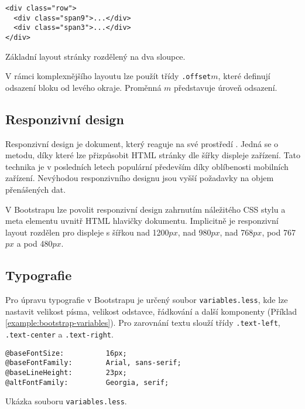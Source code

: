 \begin{example}
    \centering
    \begin{lstlisting}
<div class="row">
  <div class="span9">...</div>
  <div class="span3">...</div>
</div>
    \end{lstlisting}
    \caption{Základní layout stránky rozdělený na dva sloupce.}
    \label{example:basic-layout}
\end{example}

V rámci komplexnějšího layoutu lze použít třídy \texttt{.offset}$m$, které definují odsazení bloku od levého okraje. Proměnná $m$ představuje úroveň odsazení.

\subsection{Responzivní design}

Responzivní design je dokument, který reaguje na své prostředí \cite{responsive-design}. Jedná se o metodu, díky které lze přizpůsobit HTML stránky dle šířky displeje zařízení. Tato technika je v posledních letech populární především díky oblíbenosti mobilních zařízení. Nevýhodou responzivního designu jsou vyšší požadavky na objem přenášených dat.

V Bootstrapu lze povolit responzivní design zahrnutím náležitého CSS stylu a meta elementu uvnitř HTML hlavičky dokumentu. Implicitně je responzivní layout rozdělen pro displeje s šířkou nad 1200$px$, nad 980$px$, nad 768$px$, pod 767$px$ a pod 480$px$.

\subsection{Typografie}

Pro úpravu typografie v Bootstrapu je určený soubor \texttt{variables.less}, kde lze nastavit velikost písma, velikost odstavce, řádkování a další komponenty (Příklad \ref{example:bootstrap-variables}). Pro zarovnání textu slouží třídy \texttt{.text-left}, \texttt{.text-center} a \texttt{.text-right}.

\begin{example}
    \centering
    \begin{lstlisting}
@baseFontSize:          16px;
@baseFontFamily:        Arial, sans-serif;
@baseLineHeight:        23px;
@altFontFamily:         Georgia, serif;
    \end{lstlisting}
    \caption{Ukázka souboru \texttt{variables.less}.}
    \label{example:bootstrap-variables}
\end{example}

